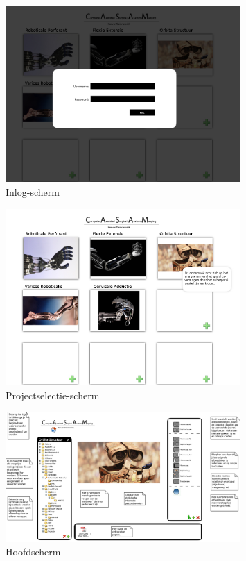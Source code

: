 \begin{figure}[htp]
\begin{center}
	\includegraphics[width=0.8\textwidth]{inlog}
\caption{Inlog-scherm}
\label{default}
\end{center}
\end{figure}

\begin{figure}[htp]
\begin{center}
	\includegraphics[width=0.8\textwidth]{projectoverzicht}
\caption{Projectselectie-scherm}
\label{default}
\end{center}
\end{figure}

\begin{figure}[htp]
\begin{center}
	\includegraphics[width=0.8\textwidth]{main_uitleg}
\caption{Hoofdscherm}
\label{default}
\end{center}
\end{figure}

